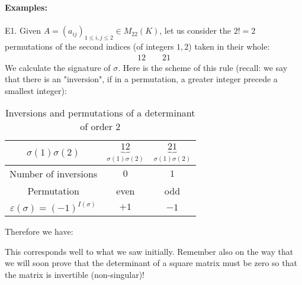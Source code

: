 	\pagebreak
	\begin{tcolorbox}[colframe=black,colback=white,sharp corners]
	\textbf{{\Large {}}Examples:}\\\\
	E1. Given $A=(a_{ij})_{1\leq i,j\leq 2}\in M_{22}(K)$, let us consider the $2!=2$ permutations of the second indices (of integers $1,2$) taken in their whole\label{determinant of two by two matrix}:
	\begin{gather*}
		12 \qquad 21
	\end{gather*}
	We calculate the signature of $\sigma$. Here is the scheme of this rule (recall: we say that there is an "inversion", if in a permutation, a greater integer precede a smallest integer):
	\begin{table}[H]	
		\begin{center}
			\begin{tabular}{|c|c|c|}
			\hline
			  \rowcolor[gray]{0.75}$\sigma(1)\sigma(2)$ & $\underbrace{12}_{\sigma(1)\sigma(2)}$ & $\underbrace{21}_{\sigma(1)\sigma(2)}$ \\
			  \hline
			  \cellcolor{black!30}Number of inversions & $0$ & $1$ \\\hline
			  \cellcolor{black!30}Permutation & even & odd  \\\hline
			  \cellcolor{black!30}$\varepsilon(\sigma)=(-1)^{I(\sigma)}$ & $+1$ & $-1$ \\\hline
			\end{tabular}
		\end{center}
		\caption{Inversions and permutations of a determinant of order $2$}
	\end{table}
	Therefore we have:
	
	This corresponds well to what we saw initially. Remember also on the way that we will soon prove that the determinant of a square matrix must be zero so that the matrix is invertible (non-singular)!\\
	

\end{tcolorbox}
